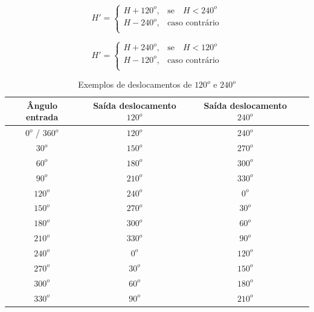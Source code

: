 \documentclass[	12pt, Times, openright, twoside, a4paper, english, brazil]{abntex2}
\begin{document}
\begin{equation}
\label{eq:deslocarH120}
H'=\left\{
\begin{array}{rl}
       H + 120^o,   &\mbox{se}\quad  H < 240^o \\
       H - 240^o,   &\mbox{caso contrário} \\
\end{array}\right.
\end{equation}

\begin{equation}
\label{eq:deslocarH240}
H'=\left\{
\begin{array}{rl}
       H + 240^o,   &\mbox{se}\quad  H < 120^o \\
       H - 120^o,   &\mbox{caso contrário} \\
\end{array}\right.
\end{equation}

\begin{table}[ht]
\centering
\begin{tabular}{cccc}
\hline      

\textbf{Ângulo entrada} & \textbf{Saída deslocamento $120^o$} & \textbf{Saída deslocamento $240^o$}     \\ \hline
$0^o$ / $360^o$         & $120^o$                       &  $240^o$                          \\ \hline
$30^o$                  & $150^o$                       &  $270^o$                          \\ \hline
$60^o$                  & $180^o$                       &  $300^o$                          \\ \hline
$90^o$                  & $210^o$                       &  $330^o$                          \\ \hline
$120^o$                 & $240^o$                       &  $0^o$                            \\ \hline
$150^o$                 & $270^o$                       &  $30^o$                           \\ \hline
$180^o$                 & $300^o$                       &  $60^o$                           \\ \hline
$210^o$                 & $330^o$                       &  $90^o$                           \\ \hline
$240^o$                 & $0^o$                         &  $120^o$                          \\ \hline
$270^o$                 & $30^o$                        &  $150^o$                          \\ \hline
$300^o$                 & $60^o$                        &  $180^o$                          \\ \hline
$330^o$                 & $90^o$                        &  $210^o$                          \\ \hline

\end{tabular}
\caption{Exemplos de deslocamentos de $120^o$ e $240^o$}
\label{tab:exemplosDeslocamento}
\end{table}
\end{document}
